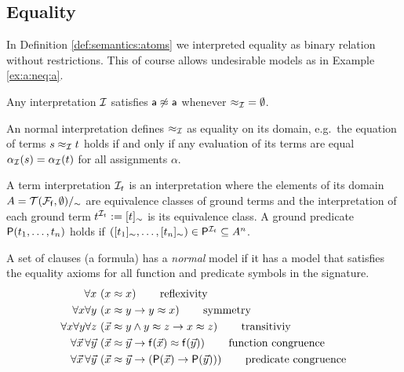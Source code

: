 \subsection{Equality}

In Definition \ref{def:semantics:atoms} we interpreted equality as binary relation without restrictions.
This of course allows undesirable models as in Example \ref{ex:a:neq:a}.

\begin{example}
	\label{ex:a:neq:a}
	Any interpretation ${\mathcal I}$ satisfies ${\mathsf a}\not\approx{\mathsf a}$ 
	whenever ${\approx_{\mathcal I}} = \emptyset$.
\end{example}

\begin{definition}
	An {\myem normal} interpretation defines $\approx_{\mathcal I}$ as equality on its domain,
	e.g.~the equation of terms $s \approx_{\mathcal I} t$ holds if and only 
	if any evaluation of its terms are equal $\alpha_{\mathcal I}(s) = \alpha_{\mathcal I}(t)$ 
	for all assignments $\alpha$.
\end{definition}

\begin{definition}
	A {\myem term interpretation} 
	${\mathcal I}_t$ 
	is an interpretation 
	where the elements of its domain $A = {{\mathcal T}({\mathcal F}_{\mathsf f},\emptyset)}/_\sim$ 
	are equivalence classes of ground terms
	and the interpretation of each ground term $t^{{\mathcal I}_t} := [t]_\sim$ is its equivalence class.
	A ground predicate ${\mathsf P}(t_1,\ldots,t_n)$ holds if 
	$([t_1]_\sim,\ldots,[t_n]_\sim) \in {\mathsf P}^{{\mathcal I}_t} \subseteq A^n$.
\end{definition}

\begin{lemma}
	A set of clauses (a formula) has a \emph{normal} model 
	if it has a model that satisfies the 
	{\myem equality axioms}
	for all function and predicate symbols in the signature.
	\begin{align*}
		\forall x\, 
		&\left(x \approx x\right) 
		\tag*{reflexivity}
		\\
		\forall x \forall y\, 
		&\left(x \approx y \rightarrow y \approx x \right)
		\tag*{symmetry} 
		\\
		\forall x \forall y \forall z\,
		&\left(\vec x \approx y \land y\approx z \rightarrow x\approx z\right) 
		\tag*{transitiviy}
		\\
		\forall\vec{x}\,\forall\vec{y}\,
		&\left(\vec{x}\approx\vec{y} \rightarrow {\mathsf f}(\vec{x}) \approx {\mathsf f}(\vec{y}) \right)
		\tag*{function congruence}
		\\
		\forall\vec{x}\,\forall\vec{y}\, 
		&\left(\vec{x}\approx\vec{y} \rightarrow ({\mathsf P}(\vec{x}) \rightarrow {\mathsf P}(\vec{y}))\right)
		\tag*{predicate congruence}
	\end{align*}
\end{lemma}

